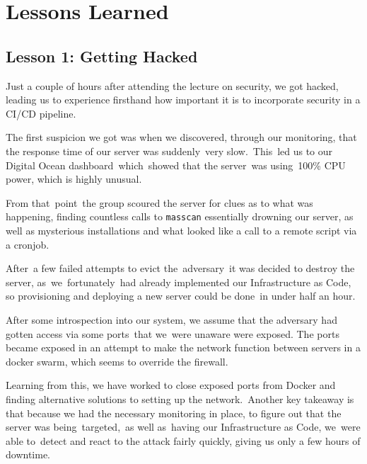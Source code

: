 \section{Lessons Learned}
\subsection{Lesson 1: Getting Hacked}
Just a couple of hours after attending the lecture on security, we got hacked, leading us to experience firsthand how important it is to incorporate security in a CI/CD pipeline.

The first suspicion we got was when we discovered, through our monitoring, that the response time of our server was suddenly very slow. This led us to our Digital Ocean dashboard which showed that the server was using 100\% CPU power, which is highly unusual.

From that point the group scoured the server for clues as to what was happening, finding countless calls to \texttt{masscan} essentially drowning our server, as well as mysterious installations and what looked like a call to a remote script via a cronjob.

After a few failed attempts to evict the adversary it was decided to destroy the server, as we fortunately had already implemented our Infrastructure as Code, so provisioning and deploying a new server could be done in under half an hour.

After some introspection into our system, we assume that the adversary had gotten access via some ports that we were unaware were exposed. The ports became exposed in an attempt to make the network function between servers in a docker swarm, which seems to override the firewall.

Learning from this, we have worked to close exposed ports from Docker and finding alternative solutions to setting up the network. Another key takeaway is that because we had the necessary monitoring in place, to figure out that the server was being targeted, as well as having our Infrastructure as Code, we were able to detect and react to the attack fairly quickly, giving us only a few hours of downtime.